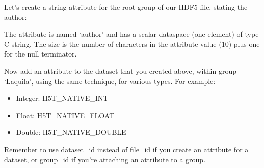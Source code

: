\documentclass[letterpaper,10pt,english]{sphinxmanual}
\begin{document}
\sphinxAtStartPar
Let’s create a string attribute for the root group of our HDF5 file, stating the author:

\begin{sphinxVerbatim}[commandchars=\\\{\}]
 \PYG{p}{[}\PYG{p}{]}  
  
   
  
 
 
       
    
\end{sphinxVerbatim}

\sphinxAtStartPar
The attribute is named ‘author’ and has a scalar dataspace (one element) of type C string. The size is the number of characters in the attribute value (10) plus one for the null terminator.

\sphinxAtStartPar
Now add an attribute to the dataset that you created above, within group ‘Laquila’, using the same technique, for various types. For example:
\begin{itemize}
\item {} 
\sphinxAtStartPar
Integer: H5T\_NATIVE\_INT

\item {} 
\sphinxAtStartPar
Float: H5T\_NATIVE\_FLOAT

\item {} 
\sphinxAtStartPar
Double: H5T\_NATIVE\_DOUBLE

\end{itemize}

\sphinxAtStartPar
Remember to use dataset\_id instead of file\_id if you create an attribute for a dataset, or group\_id if you’re attaching an attribute to a group.
\end{document}
